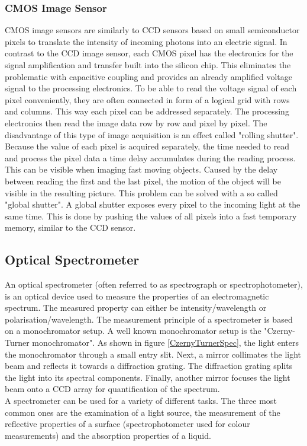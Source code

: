 \subsubsection{CMOS Image Sensor}
CMOS image sensors are similarly to CCD sensors based on small semiconductor pixels to translate the intensity of incoming photons into an electric signal. In contrast to the CCD image sensor, each CMOS pixel has the electronics for the signal amplification and transfer built into the silicon chip. This eliminates the problematic with capacitive coupling and provides an already amplified voltage signal to the processing electronics. To be able to read the voltage signal of each pixel conveniently, they are often connected in form of a logical grid with rows and columns. This way each pixel can be addressed separately. The processing electronics then read the image data row by row and pixel by pixel. The disadvantage of this type of image acquisition is an effect called "rolling shutter". Because the value of each pixel is acquired separately, the time needed to read and process the pixel data a time delay accumulates during the reading process. This can be visible when imaging fast moving objects. Caused by the delay between reading the first and the last pixel, the motion of the object will be visible in the resulting picture. This problem can be solved with a so called "global shutter". A global shutter exposes every pixel to the incoming light at the same time. This is done by pushing the values of all pixels into a fast temporary memory, similar to the CCD sensor.\cite{LoefflerLang2020}\cite{Basler2018RollingShutter} 

\subsection{Optical Spectrometer}
An optical spectrometer (often referred to as spectrograph or spectrophotometer), is an optical device used to measure the properties of an electromagnetic spectrum. The measured property can either be intensity/wavelength or polarisation/wavelength. The measurement principle of a spectrometer is based on a monochromator setup. A well known monochromator setup is the "Czerny-Turner monochromator". As shown in figure \ref{CzernyTurnerSpec}, the light enters the monochromator through a small entry slit. Next, a mirror collimates the light beam and reflects it towards a diffraction grating. The diffraction grating splits the light into its spectral components. Finally, another mirror focuses the light beam onto a CCD array for quantification of the spectrum.\cite{LoefflerLang2020}\\
A spectrometer can be used for a variety of different tasks. The three most common ones are the examination of a light source, the measurement of the reflective properties of a surface (spectrophotometer used for colour measurements) and the absorption properties of a liquid.

